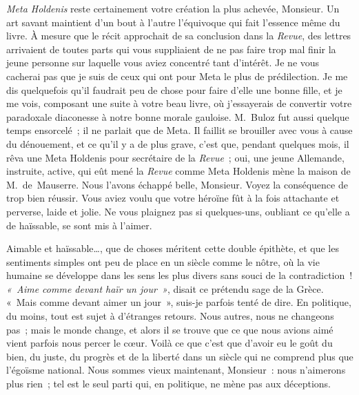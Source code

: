 \documentclass[french,twoside]{book} %
\newcommand\persName[1]{#1}
\newcommand\placeName[1]{#1}
\begin{document}
\emph{Meta Holdenis} reste certainement votre création la plus achevée, Monsieur. Un art savant maintient d’un bout à l’autre l’équivoque qui fait l’essence même du livre. À mesure que le récit approchait de sa conclusion dans la \emph{Revue}, des lettres arrivaient de toutes parts qui vous suppliaient de ne pas faire trop mal finir la jeune personne sur laquelle vous aviez concentré tant d’intérêt. Je ne vous cacherai pas que je suis de ceux qui ont pour {\persName Meta} le plus de prédilection. Je me dis quelquefois qu’il faudrait peu de chose pour faire d’elle une bonne fille, et je me vois, composant une suite à votre beau livre, où j’essayerais de convertir votre paradoxale diaconesse à notre bonne morale gauloise. {\persName M. Buloz} fut aussi quelque temps ensorcelé ; il ne parlait que de {\persName Meta}. Il faillit se brouiller avec vous à cause du dénouement, et ce qu’il y a de plus grave, c’est que, pendant quelques mois, il rêva une {\persName Meta Holdenis} pour secrétaire de la \emph{Revue} ; oui, une jeune Allemande, instruite, active, qui eût mené la \emph{Revue} comme {\persName Meta Holdenis} mène la maison de {\persName M. de Mauserre}. Nous l’avons échappé belle, Monsieur. Voyez la conséquence de trop bien réussir. Vous aviez voulu que votre héroïne fût à la fois attachante et perverse, laide et jolie. Ne vous plaignez pas si quelques-uns, oubliant ce qu’elle a de haïssable, se sont mis à l’aimer.\par
Aimable et haïssable…, que de choses méritent cette double épithète, et que les sentiments simples ont peu de place en un siècle comme le nôtre, où la vie humaine se développe dans les sens les plus divers sans souci de la contradiction ! \emph{« Aime comme devant haïr un jour »}, disait ce prétendu sage de la {\placeName Grèce}. « Mais comme devant aimer un jour », suis-je parfois tenté de dire. En politique, du moins, tout est sujet à d’étranges retours. Nous autres, nous ne changeons pas ; mais le monde change, et alors il se trouve que ce que nous avions aimé vient parfois nous percer le cœur. Voilà ce que c’est que d’avoir eu le goût du bien, du juste, du progrès et de la liberté dans un siècle qui ne comprend plus que l’égoïsme national. Nous sommes vieux maintenant, Monsieur : nous n’aimerons plus rien ; tel est le seul parti qui, en politique, ne mène pas aux déceptions.\par
\end{document}
